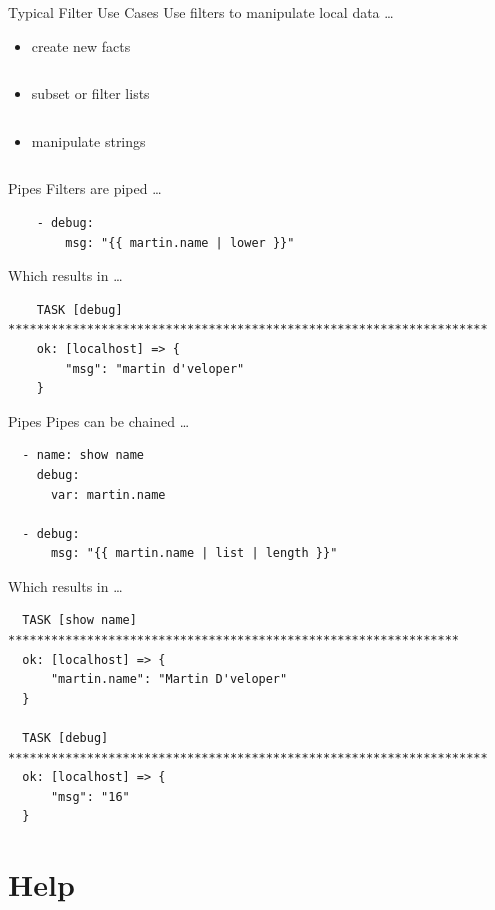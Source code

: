 \documentclass[pdf]{beamer}
\begin{document}
\begin{frame}[t,fragile]{Typical Filter Use Cases}
  Use filters to manipulate local data \ldots \pause
  \begin{itemize}
    \item<+-> create new facts
       {\inputminted[firstline=34,lastline=36]{yaml}{filter-examples.yaml}}
    \item<+-> subset or filter lists
       {\inputminted[firstline=52,lastline=62]{yaml}{filter-examples.yaml}}
    \item<+-> manipulate strings
       {\inputminted[firstline=85,lastline=97]{yaml}{filter-examples.yaml}}
  \end{itemize}
\end{frame}

\begin{frame}[t,fragile]{Pipes}
  Filters are piped \ldots
  \pause
  \begin{verbatim}
    - debug:
        msg: "{{ martin.name | lower }}"
  \end{verbatim}
  \pause
  Which results in \ldots
  \begin{verbatim}
    TASK [debug] *******************************************************************
    ok: [localhost] => {
        "msg": "martin d'veloper"
    }
  \end{verbatim}
\end{frame}

\begin{frame}[t,fragile]{Pipes}
  Pipes can be chained \ldots
  \pause
  \begin{verbatim}
  - name: show name
    debug:
      var: martin.name

  - debug:
      msg: "{{ martin.name | list | length }}"
  \end{verbatim}
  \pause
  Which results in \ldots
  \begin{verbatim}
  TASK [show name] ***************************************************************
  ok: [localhost] => {
      "martin.name": "Martin D'veloper"
  }

  TASK [debug] *******************************************************************
  ok: [localhost] => {
      "msg": "16"
  }
  \end{verbatim}
\end{frame}

\section{Help}
\end{document}
